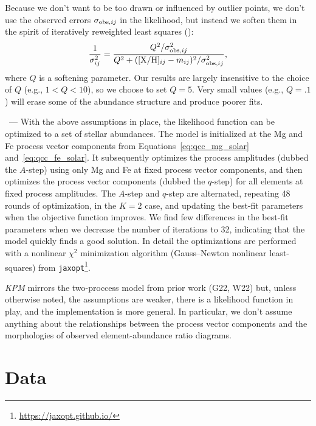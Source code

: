\documentclass[modern, linenumbers]{aastex631}
\newcommand{\xh}{[{\rm X}/{\rm H}]}
\newcommand{\name}{\textsl{KPM}}
\renewcommand{\paragraph}[1]{\bigskip\par\noindent{\textbf{#1}}~---}
\begin{document}
Because we don't want to be too drawn or influenced by outlier points, we don't use the observed errors $\sigma_{{\rm obs},ij}$ in the likelihood, but instead we soften them in the spirit of iteratively reweighted least squares (\citealt{irls}):
\begin{equation}\label{eq:inflate_ivar}
    \frac{1}{\sigma_{ij}^2} = \frac{Q^2/\sigma_{{\rm obs},ij}^2}{Q^2 + (\xh_{ij} - m_{ij})^2 /\sigma_{{\rm obs},ij}^2 },    
\end{equation}
where $Q$ is a softening parameter. Our results are largely insensitive to the choice of $Q$ (e.g., $1 < Q < 10$), so we choose to set $Q=5$. Very small values (e.g., $Q=.1$) will erase some of the abundance structure and produce poorer fits.

\paragraph{9. Implementation and optimization} 
With the above assumptions in place, the likelihood function can be optimized to a set of stellar abundances.
The model is initialized at the Mg and Fe process vector components from Equations~\ref{eq:qcc_mg_solar} and~\ref{eq:qcc_fe_solar}. It subsequently optimizes the process amplitudes (dubbed the $A$-step) using only Mg and Fe at fixed process vector components, and then optimizes the process vector components (dubbed the $q$-step) for all elements at fixed process amplitudes.
The $A$-step and $q$-step are alternated, repeating 48 rounds of optimization, in the $K=2$ case, and updating the best-fit parameters when the objective function improves. We find few differences in the best-fit parameters when we decrease the number of iterations to 32, indicating that the model quickly finds a good solution.  
In detail the optimizations are performed with a nonlinear $\chi^2$ minimization algorithm (Gauss--Newton nonlinear least-squares) from \texttt{jaxopt}\footnote{\url{https://jaxopt.github.io/}}.

\bigskip
\name{} mirrors the two-proccess model from prior work (G22, W22) but, unless otherwise noted, the assumptions are weaker, there is a likelihood function in play, and the implementation is more general.
In particular, we don't assume anything about the relationships between the process vector components and the morphologies of observed element-abundance ratio diagrams.

\section{Data}\label{sec:data}
\end{document}
